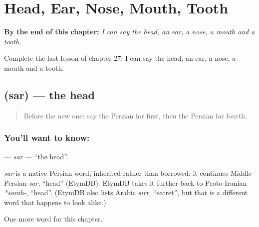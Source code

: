 
\chapter{Head, Ear, Nose, Mouth, Tooth}
\label{ch:fa-head-ear-nose-mouth-tooth}

\begin{chapteropening}
\textbf{By the end of this chapter:} \emph{I can say the head, an ear, a nose, a mouth and a tooth.}

Complete the last lesson of chapter 27: I can say the head, an ear, a nose, a mouth and a tooth.
\end{chapteropening}

\section[\texorpdfstring{\fa{سر} (sar)}{سر (sar)}]{ (sar) — the head}

\label{lesson:FA-C27-sar}



\begin{quote}
Before the new one: say the Persian for first, then the Persian for fourth.
\end{quote}

\subsection*{You'll want to know: }
\textbf{} — \emph{sar} — \textquotedblleft{}the head\textquotedblright{}.

\begin{cousinweb}
\emph{sar} is a native Persian word, inherited rather than borrowed: it continues Middle Persian \emph{sar}, \textquotedblleft{}head\textquotedblright{} (EtymDB). EtymDB takes it further back to Proto-Iranian \emph{*sarah-}, \textquotedblleft{}head\textquotedblright{}. (EtymDB also lists Arabic \emph{sirr}, \textquotedblleft{}secret\textquotedblright{}, but that is a different word that happens to look alike.)
\end{cousinweb}

\begin{grammarlens}[title={What you've built}]
One more word for this chapter.
\end{grammarlens}

